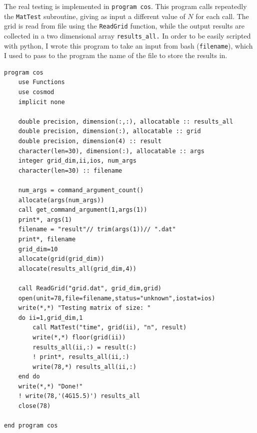 \documentclass[a4paper]{article}
\begin{document}
\noindent The real testing is implemented in \lstinline{program cos}.
This program calls repeatedly the \lstinline{MatTest} subroutine, giving as input a different value of $N$ for each call.
The grid is read from file using the \lstinline{ReadGrid} function, while the output results are collected in a two dimensional array \lstinline{results_all.}
In order to be easily scripted with python, I wrote this program to take an input from bash (\lstinline{filename}), which I used to pass to the program the name of the file to store the results in.
\begin{lstlisting}
program cos
    use Functions
    use cosmod
    implicit none

    double precision, dimension(:,:), allocatable :: results_all
    double precision, dimension(:), allocatable :: grid
    double precision, dimension(4) :: result
    character(len=30), dimension(:), allocatable :: args
    integer grid_dim,ii,ios, num_args
    character(len=30) :: filename

    num_args = command_argument_count()
    allocate(args(num_args)) 
    call get_command_argument(1,args(1))
    print*, args(1)
    filename = "result"// trim(args(1))// ".dat"
    print*, filename 
    grid_dim=10
    allocate(grid(grid_dim))
    allocate(results_all(grid_dim,4))

    call ReadGrid("grid.dat", grid_dim,grid)
    open(unit=78,file=filename,status="unknown",iostat=ios)
    write(*,*) "Testing matrix of size: "
    do ii=1,grid_dim,1
        call MatTest("time", grid(ii), "n", result)
        write(*,*) floor(grid(ii))
        results_all(ii,:) = result(:)
        ! print*, results_all(ii,:)
        write(78,*) results_all(ii,:)
    end do
    write(*,*) "Done!"
    ! write(78,'(4G15.5)') results_all
    close(78)

end program cos
\end{lstlisting}
\end{document}
